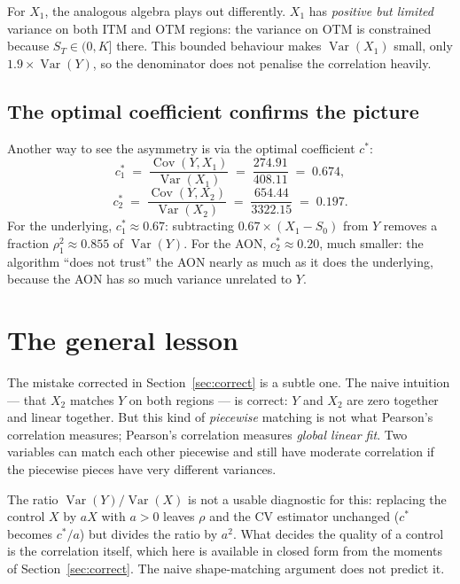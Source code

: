\documentclass[11pt,a4paper]{article}
\theoremstyle{plain}
\theoremstyle{definition}
\theoremstyle{remark}
\newcommand{\Var}{\operatorname{Var}}
\newcommand{\Cov}{\operatorname{Cov}}
\begin{document}
For $X_1$, the analogous algebra plays out differently. $X_1$ has
\emph{positive but limited} variance on both ITM and OTM regions:
the variance on OTM is constrained because $S_T \in (0, K]$ there.
This bounded behaviour makes $\Var(X_1)$ small, only $1.9 \times
\Var(Y)$, so the denominator does not penalise the correlation
heavily.

\subsection{The optimal coefficient confirms the picture}

Another way to see the asymmetry is via the optimal coefficient
$c^*$:
\begin{equation}
c_1^* \;=\; \frac{\Cov(Y, X_1)}{\Var(X_1)} \;=\; \frac{274.91}{408.11}
\;=\; 0.674,
\end{equation}
\begin{equation}
c_2^* \;=\; \frac{\Cov(Y, X_2)}{\Var(X_2)} \;=\; \frac{654.44}{3322.15}
\;=\; 0.197.
\end{equation}
For the underlying, $c_1^* \approx 0.67$: subtracting $0.67 \times
(X_1 - S_0)$ from $Y$ removes a fraction $\rho_1^2 \approx 0.855$ of
$\Var(Y)$. For the AON, $c_2^* \approx 0.20$, much
smaller: the algorithm ``does not trust'' the AON nearly as much as
it does the underlying, because the AON has so much variance unrelated
to $Y$.

\section{The general lesson}
\label{sec:lesson}

The mistake corrected in Section~\ref{sec:correct} is a subtle one.
The naive intuition --- that $X_2$ matches $Y$ on both regions ---
is correct: $Y$ and $X_2$ are zero together and linear together. But
this kind of \emph{piecewise} matching is not what Pearson's
correlation measures; Pearson's correlation measures \emph{global
linear fit}. Two variables can match each other piecewise and still
have moderate correlation if the piecewise pieces have very
different variances.

The ratio $\Var(Y) / \Var(X)$ is not a usable diagnostic for this:
replacing the control $X$ by $aX$ with $a > 0$ leaves $\rho$ and the
CV estimator unchanged ($c^*$ becomes $c^*/a$) but divides the ratio
by $a^2$. What decides the quality of a control is the correlation
itself, which here is available in closed form from the moments of
Section~\ref{sec:correct}. The naive shape-matching argument does
not predict it.
\end{document}
